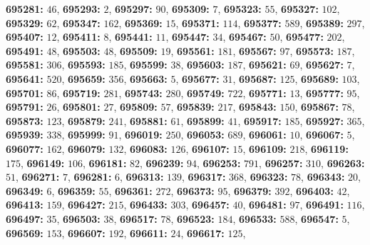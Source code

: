 \textsf{\bfseries 695281:} $46$, \textsf{\bfseries 695293:} $2$, \textsf{\bfseries 695297:} $90$, \textsf{\bfseries 695309:} $7$, \textsf{\bfseries 695323:} $55$, \textsf{\bfseries 695327:} $102$, \textsf{\bfseries 695329:} $62$, \textsf{\bfseries 695347:} $162$, \textsf{\bfseries 695369:} $15$, \textsf{\bfseries 695371:} $114$, \textsf{\bfseries 695377:} $589$, \textsf{\bfseries 695389:} $297$, \textsf{\bfseries 695407:} $12$, \textsf{\bfseries 695411:} $8$, \textsf{\bfseries 695441:} $11$, \textsf{\bfseries 695447:} $34$, \textsf{\bfseries 695467:} $50$, \textsf{\bfseries 695477:} $202$, \textsf{\bfseries 695491:} $48$, \textsf{\bfseries 695503:} $48$, \textsf{\bfseries 695509:} $19$, \textsf{\bfseries 695561:} $181$, \textsf{\bfseries 695567:} $97$, \textsf{\bfseries 695573:} $187$, \textsf{\bfseries 695581:} $306$, \textsf{\bfseries 695593:} $185$, \textsf{\bfseries 695599:} $38$, \textsf{\bfseries 695603:} $187$, \textsf{\bfseries 695621:} $69$, \textsf{\bfseries 695627:} $7$, \textsf{\bfseries 695641:} $520$, \textsf{\bfseries 695659:} $356$, \textsf{\bfseries 695663:} $5$, \textsf{\bfseries 695677:} $31$, \textsf{\bfseries 695687:} $125$, \textsf{\bfseries 695689:} $103$, \textsf{\bfseries 695701:} $86$, \textsf{\bfseries 695719:} $281$, \textsf{\bfseries 695743:} $280$, \textsf{\bfseries 695749:} $722$, \textsf{\bfseries 695771:} $13$, \textsf{\bfseries 695777:} $95$, \textsf{\bfseries 695791:} $26$, \textsf{\bfseries 695801:} $27$, \textsf{\bfseries 695809:} $57$, \textsf{\bfseries 695839:} $217$, \textsf{\bfseries 695843:} $150$, \textsf{\bfseries 695867:} $78$, \textsf{\bfseries 695873:} $123$, \textsf{\bfseries 695879:} $241$, \textsf{\bfseries 695881:} $61$, \textsf{\bfseries 695899:} $41$, \textsf{\bfseries 695917:} $185$, \textsf{\bfseries 695927:} $365$, \textsf{\bfseries 695939:} $338$, \textsf{\bfseries 695999:} $91$, \textsf{\bfseries 696019:} $250$, \textsf{\bfseries 696053:} $689$, \textsf{\bfseries 696061:} $10$, \textsf{\bfseries 696067:} $5$, \textsf{\bfseries 696077:} $162$, \textsf{\bfseries 696079:} $132$, \textsf{\bfseries 696083:} $126$, \textsf{\bfseries 696107:} $15$, \textsf{\bfseries 696109:} $218$, \textsf{\bfseries 696119:} $175$, \textsf{\bfseries 696149:} $106$, \textsf{\bfseries 696181:} $82$, \textsf{\bfseries 696239:} $94$, \textsf{\bfseries 696253:} $791$, \textsf{\bfseries 696257:} $310$, \textsf{\bfseries 696263:} $51$, \textsf{\bfseries 696271:} $7$, \textsf{\bfseries 696281:} $6$, \textsf{\bfseries 696313:} $139$, \textsf{\bfseries 696317:} $368$, \textsf{\bfseries 696323:} $78$, \textsf{\bfseries 696343:} $20$, \textsf{\bfseries 696349:} $6$, \textsf{\bfseries 696359:} $55$, \textsf{\bfseries 696361:} $272$, \textsf{\bfseries 696373:} $95$, \textsf{\bfseries 696379:} $392$, \textsf{\bfseries 696403:} $42$, \textsf{\bfseries 696413:} $159$, \textsf{\bfseries 696427:} $215$, \textsf{\bfseries 696433:} $303$, \textsf{\bfseries 696457:} $40$, \textsf{\bfseries 696481:} $97$, \textsf{\bfseries 696491:} $116$, \textsf{\bfseries 696497:} $35$, \textsf{\bfseries 696503:} $38$, \textsf{\bfseries 696517:} $78$, \textsf{\bfseries 696523:} $184$, \textsf{\bfseries 696533:} $588$, \textsf{\bfseries 696547:} $5$, \textsf{\bfseries 696569:} $153$, \textsf{\bfseries 696607:} $192$, \textsf{\bfseries 696611:} $24$, \textsf{\bfseries 696617:} $125$, 
